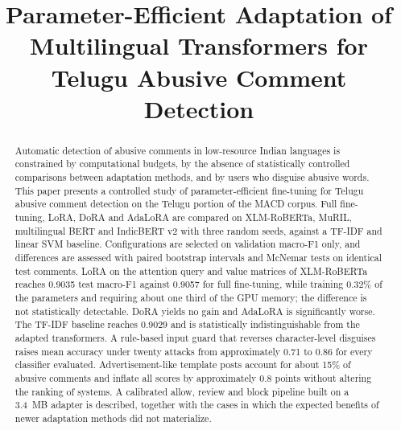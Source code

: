 \documentclass[conference]{IEEEtran}
\begin{document}
\title{Parameter-Efficient Adaptation of Multilingual Transformers for Telugu Abusive Comment Detection}

\author{
\and
{}
\and
{}
}

\maketitle

\begin{abstract}
Automatic detection of abusive comments in low-resource Indian languages is constrained by computational budgets, by the absence of statistically controlled comparisons between adaptation methods, and by users who disguise abusive words. This paper presents a controlled study of parameter-efficient fine-tuning for Telugu abusive comment detection on the Telugu portion of the MACD corpus. Full fine-tuning, LoRA, DoRA and AdaLoRA are compared on XLM-RoBERTa, MuRIL, multilingual BERT and IndicBERT v2 with three random seeds, against a TF-IDF and linear SVM baseline. Configurations are selected on validation macro-F1 only, and differences are assessed with paired bootstrap intervals and McNemar tests on identical test comments. LoRA on the attention query and value matrices of XLM-RoBERTa reaches 0.9035 test macro-F1 against 0.9057 for full fine-tuning, while training 0.32\% of the parameters and requiring about one third of the GPU memory; the difference is not statistically detectable. DoRA yields no gain and AdaLoRA is significantly worse. The TF-IDF baseline reaches 0.9029 and is statistically indistinguishable from the adapted transformers. A rule-based input guard that reverses character-level disguises raises mean accuracy under twenty attacks from approximately 0.71 to 0.86 for every classifier evaluated. Advertisement-like template posts account for about 15\% of abusive comments and inflate all scores by approximately 0.8 points without altering the ranking of systems. A calibrated allow, review and block pipeline built on a 3.4~MB adapter is described, together with the cases in which the expected benefits of newer adaptation methods did not materialize.
\end{abstract}
\end{document}
